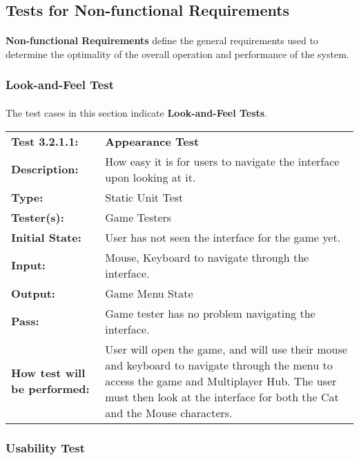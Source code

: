 \documentclass[12pt, titlepage]{article}
\begin{document}
\subsection{Tests for Non-functional Requirements}
\paragraph{}\textbf{Non-functional Requirements} define the general requirements used to determine the optimality of the overall operation and performance of the system.

\subsubsection{Look-and-Feel Test}
\paragraph{}The test cases in this section indicate \textbf{Look-and-Feel Tests}.

\begin{mdframed}[linewidth=1pt]
\begin{tabularx}{\textwidth}{@{}p{3cm}X@{}}
{\bf Test 3.2.1.1:} & {\bf Appearance Test}\\[\baselineskip]
{\bf Description:} & How easy it is for users to navigate the interface upon looking at it.\\[0.5\baselineskip]
{\bf Type:} & Static Unit Test\\[0.5\baselineskip]
{\bf Tester(s):} & Game Testers\\[0.5\baselineskip]
{\bf Initial State:} & User has not seen the interface for the game yet.\\[0.5\baselineskip]
{\bf Input:} & Mouse, Keyboard to navigate through the interface.\\[0.5\baselineskip]
{\bf Output:} & Game Menu State\\[0.5\baselineskip]
{\bf Pass:} & Game tester has no problem navigating the interface.\\[0.5\baselineskip]
{\bf How test will be performed:} & User will open the game, and will use their mouse and keyboard to navigate through the menu to access the game and Multiplayer Hub. The user must then look at the interface for both the Cat and the Mouse characters.
\end{tabularx}
\end{mdframed}

\newpage
\subsubsection{Usability Test}
\end{document}
